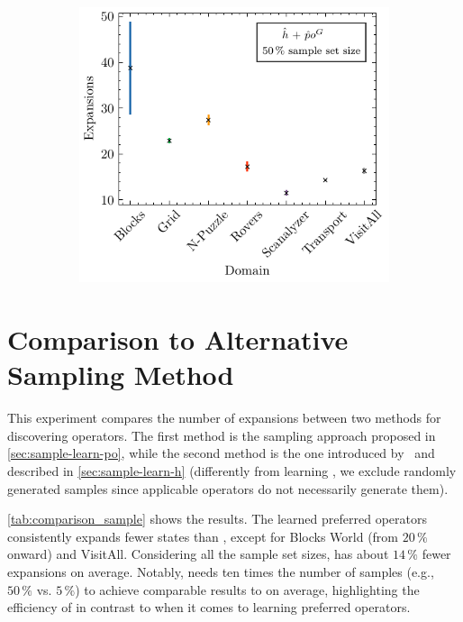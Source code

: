 \documentclass[ppgc,diss,english]{iiufrgs}
\begin{document}
\begin{figure}[tb]
  \vspace{0.5cm}

  \begin{subfigure}{0.41\textwidth}
    \centering
    \includegraphics[width=\linewidth]{img/error_hNN_poG_50pct.pdf}
  \end{subfigure}
  \label{fig:errors}
\end{figure}


\section{Comparison to Alternative Sampling Method}
\label{sec:exp-comparison-sample-method}
This experiment compares the number of expansions between two methods for discovering operators. The first method is the sampling approach proposed in \cref{sec:sample-learn-po}, while the second method is the one introduced by~\citet{Bettker.etal/2022} and described in \cref{sec:sample-learn-h} (differently from learning \hnn, we exclude randomly generated samples since applicable operators do not necessarily generate them).

\cref{tab:comparison_sample} shows the results. The learned preferred operators \pog consistently expands fewer states than \pofsm, except for Blocks World (from $20\,\%$ onward) and VisitAll. Considering all the sample set sizes, \pog has about $14\,\%$ fewer expansions on average. Notably, \pofsm needs ten times the number of samples (e.g., $50\,\%$ vs. $5\,\%$) to achieve comparable results to \pog on average, highlighting the efficiency of \bfsrs in contrast to \bfsrw when it comes to learning preferred operators.
\end{document}
